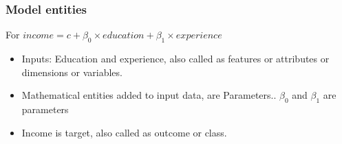 

\begin{frame}[fragile]\frametitle{Model entities}
For $income = c + \beta_0 \times education + \beta_1 \times experience$
\begin{itemize}
\item Inputs: Education and experience, also called as features or attributes or dimensions or variables.
\item Mathematical entities added to input data, are Parameters.. $\beta_0$ and $\beta_1$ are parameters
\item Income is target, also called as outcome or class.
\end{itemize}
\end{frame}







